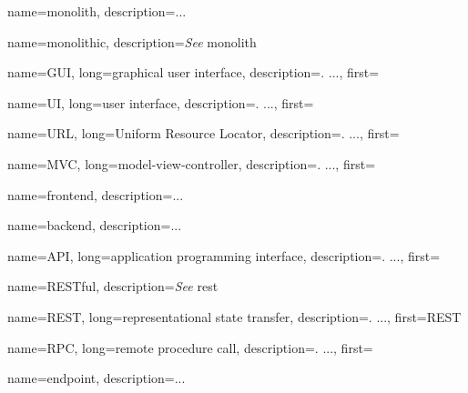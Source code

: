 

{
    name=monolith,
    description={...} %
}

{
    name=monolithic,
    description={\textit{See} \gls{monolith}}
}

{
    name=GUI,
    long={graphical user interface},
    description={. ...},%
    first=
}

{
    name=UI,
    long={user interface},
    description={. ...},%
    first=
}

{
    name=URL,
    long={Uniform Resource Locator},
    description={. ...},%
    first=
}

{
    name=MVC,
    long={model-view-controller},
    description={. ...},
    first=
}

{
    name=frontend,
    description={...} %
}

{
    name=backend,
    description={...} %
}

{
    name=API,
    long={application programming interface},
    description={. ...},%
    first=
}

{
    name=RESTful,
    description={\textit{See} \gls{rest}}
}

{
    name=REST,
    long={representational state transfer},
    description={. ...},%
    first=REST %
}

{
    name=RPC,
    long={remote procedure call},
    description={. ...},%
    first= %
}

{
    name=endpoint,
    description={...} %
}

